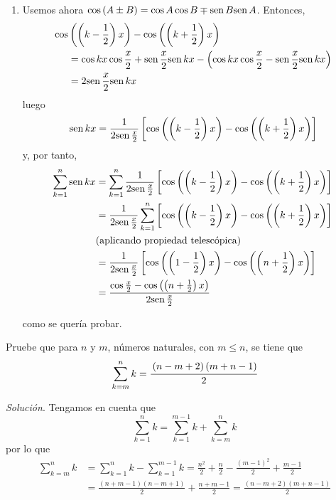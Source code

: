 \begin{enumerate}[leftmargin=1.2em,   itemindent=0pt,       labelwidth=\labelwidth,
	labelsep=0.5em,]
\item [b)] Usemos ahora $\cos \left( A\pm B\right) =\cos A\cos B\mp \text{\rm sen}\, B\text{\rm sen}\, A$. Entonces,
\begin{align*}
\cos &\left( \left( k-\frac{1}{2}\right) x\right) -\cos \left( \left( k+\frac{1}{2}\right) x\right)\\
 &=\cos kx\cos \frac{x}{2}+\text{\rm sen}\, \frac{x}{2}\text{\rm sen}\,
kx-\left( \cos kx\cos \frac{x}{2}-\text{\rm sen}\, \frac{x}{2}\text{\rm sen}\, kx\right)\\
&=2\text{\rm sen}\, \frac{x}{2}\text{\rm sen}\, kx
\end{align*}
luego
\[
\sen kx=\frac{1}{2\sen\frac{x}{2}}\left[ \cos \left( \left( k-\frac{1%
}{2}\right) x\right) -\cos \left( \left( k+\frac{1}{2}\right) x\right) %
\right]
\]
y, por tanto,
{\small
\begin{align*}
\sum\limits_{k=1}^{n}\sen kx&=\sum\limits_{k=1}^{n}\frac{1}{2\sen\frac{x}{2}}\left[ \cos \left( \left( k-\frac{1}{2}\right) x\right) -\cos \left(
\left( k+\frac{1}{2}\right) x\right) \right]\\
&=\frac{1}{2\sen\frac{x}{2}}\sum\limits_{k=1}^{n}\left[ \cos \left( \left(
k-\frac{1}{2}\right) x\right) -\cos \left( \left( k+\frac{1}{2}\right)
x\right) \right]\\
&\text{(aplicando propiedad telescópica)}\\ \
&=\frac{1}{2\sen\frac{x}{2}}\left[ \cos \left( \left( 1-\frac{1}{2}\right)
x\right) -\cos \left( \left( n+\frac{1}{2}\right) x\right) \right] \\
&=\frac{\cos \frac{x}{2} -\cos \left( \left( n+\frac{1}{2}%
\right) x\right) }{2\sen \frac{x}{2}}
\end{align*}
}

como se quería probar.
\end{enumerate}

\begin{ejemplo}
\textnormal{Pruebe que para \textit{$n$} y \textit{$m$}, números naturales, con \textit{$m\leq n$}, se tiene que} \[
\displaystyle{\sum_{k=m}^{n}k}=\cfrac{\left( n-m+2\right) \left( m+n-1\right) }{2}
\]
\end{ejemplo}

\textit{Solución}. Tengamos en cuenta que
\[
\sum_{k=1}^n k=\sum_{k=1}^{m-1} k+ \sum_{k=m}^n k
\]
por lo que
{\small
\begin{align*}
\sum_{k=m}^{n}k&=\sum_{k=1}^{n}k-\sum_{k=1}^{m-1}k%
=\frac{n^{2}}{2}+\frac{n}{2}-\frac{\left( m-1\right) ^{2}}{2}+\frac{m-1}{2}\\
&=\frac{\left( n+m-1\right)\left( n-m+1\right) }{2}+\frac{n+m-1}{2}%
=\frac{\left( n-m+2\right) \left( m+n-1\right) }{2} 
\end{align*}
}

